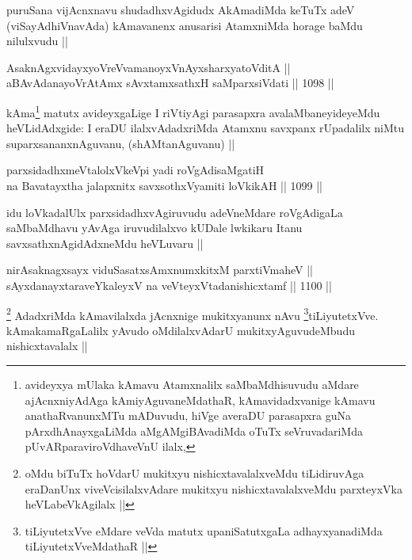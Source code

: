 \begin{artha}
puruSana vijAcnxnavu shudadhxvAgidudx AkAmadiMda keTuTx adeV (viSayAdhiVnavAda) kAmavanenx anusarisi AtamxniMda horage baMdu nilulxvudu ||
\end{artha}


\begin{shl}
AsaknAgxvidayxyoVreVvamanoyxVnAyxsharxyatoVditA || \\
aBAvAdanayoVrAtAmx sAvxtamxsathxH saMparxsiVdati ||  1098 ||  
\end{shl}

\begin{artha}
kAma\footnote{avideyxya mUlaka kAmavu Atamxnalilx saMbaMdhisuvudu aMdare ajAcnxniyAdAga kAmiyAguvaneMdathaR, kAmavidadxvanige kAmavu anathaRvanunxMTu mADuvudu, hiVge averaDU parasapxra guNa pArxdhAnayxgaLiMda aMgAMgiBAvadiMda oTuTx seVruvadariMda pUvARparaviroVdhaveVnU ilalx,} matutx avideyxgaLige I riVtiyAgi parasapxra avalaMbaneyideyeMdu heVLidAdxgide: I eraDU ilalxvAdadxriMda Atamxnu savxpanx rUpadalilx niMtu suparxsananxnAguvanu, (shAMtanAguvanu) ||
\end{artha}

\begin{shl}
parxsidadhxmeVtalolxVkeV\s pi yadi roVgAdisaMgatiH \\
na Bavatayxtha jalapxnitx savxsothxV\s yamiti loVkikAH ||  1099 || 
\end{shl}

\begin{artha}
idu loVkadalUlx parxsidadhxvAgiruvudu adeVneMdare roVgAdigaLa saMbaMdhavu yAvAga iruvudilalxvo kUDale lwkikaru Itanu savxsathxnAgidAdxneMdu heVLuvaru ||
\end{artha}


\begin{shl}
nirAsaknagxsayx viduSasatxsAmxnumxkitxM parxtiVmaheV || \\
sAyxdanayxtaraveYkaleyxV na veVteyxVtadanishicxtamf ||  1100 ||  
\end{shl}

\begin{artha}
\footnote{oMdu biTuTx hoVdarU mukitxyu nishicxtavalalxveMdu tiLidiruvAga eraDanUnx viveVcisilalxvAdare mukitxyu nishicxtavalalxveMdu parxteyxVka heVLabeVkAgilalx ||}
AdadxriMda kAmavilalxda jAcnxnige mukitxyanunx nAvu \footnote{tiLiyutetxVve eMdare veVda matutx upaniSatutxgaLa adhayxyanadiMda tiLiyutetxVveMdathaR ||}tiLiyutetxVve. kAmakamaRgaLalilx yAvudo oMdilalxvAdarU mukitxyAguvudeMbudu nishicxtavalalx ||
\end{artha}

